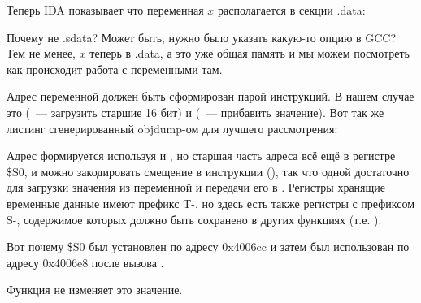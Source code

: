 Теперь IDA показывает что переменная $x$ располагается в секции .data:



Почему не .sdata? Может быть, нужно было указать какую-то опцию в GCC?
Тем не менее, $x$ теперь в .data, а это уже общая память и мы можем посмотреть как происходит
работа с переменными там.

Адрес переменной должен быть сформирован парой инструкций.
В нашем случае это  (~--- загрузить старшие 16 бит) и 
 (~--- прибавить значение).
Вот так же листинг сгенерированный objdump-ом для лучшего рассмотрения:



Адрес формируется используя  и , но старшая часть адреса
всё ещё в регистре \$S0, и можно закодировать смещение в инструкции  (), так что одной
 достаточно для загрузки значения из переменной и передачи его в \printf.
Регистры хранящие временные данные имеют префикс T-, но здесь есть также регистры с префиксом S-,
содержимое которых должно быть сохранено в других функциях (т.е. ).

Вот почему \$S0 был установлен по адресу 0x4006cc и затем был использован по адресу 0x4006e8
после вызова \scanf.

Функция \scanf не изменяет это значение.

